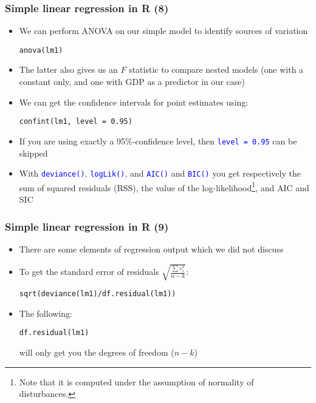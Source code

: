 \documentclass[10pt]{beamer}
\newcommand{\cc}[1]{\texttt{\textcolor{blue}{#1}}}
\theoremstyle{definition}
\begin{document}
\begin{frame}[fragile]
\frametitle{Simple linear regression in R (8)}
\begin{itemize}
	\item We can perform ANOVA on our simple model to identify sources of variation
	\begin{lstlisting}[style = rstyle, breaklines]
	anova(lm1)
	\end{lstlisting}
	\item The latter also gives us an $F$ statistic to compare nested models (one with a constant only, and one with GDP as a predictor in our case)
	\item We can get the confidence intervals for point estimates using:
	\begin{lstlisting}[style = rstyle, breaklines]
	confint(lm1, level = 0.95)
	\end{lstlisting}
	\item If you are using exactly a 95\%-confidence level, then \cc{level = 0.95} can be skipped
	\item With \cc{deviance()}, \cc{logLik()}, and \cc{AIC()} and \cc{BIC()} you get respectively the sum of squared residuals (RSS), the value of the log-likelihood\footnote{Note that it is computed under the assumption of normality of disturbances.}, and AIC and SIC
\end{itemize}
\end{frame}

\begin{frame}[fragile]
\frametitle{Simple linear regression in R (9)}
\begin{itemize}
	\item There are some elements of regression output which we did not discuss
	\item To get the standard error of residuals $\displaystyle \sqrt{\frac{\sum \varepsilon_{i}^{2}}{n-k}}$:
	\begin{lstlisting}[style = rstyle, breaklines]
	sqrt(deviance(lm1)/df.residual(lm1))
	\end{lstlisting}
	\item The following:
	\begin{lstlisting}[style = rstyle, breaklines]
	df.residual(lm1)
	\end{lstlisting}
	will only get you the degrees of freedom ($n-k$)
\end{itemize}
\end{frame}
\end{document}
